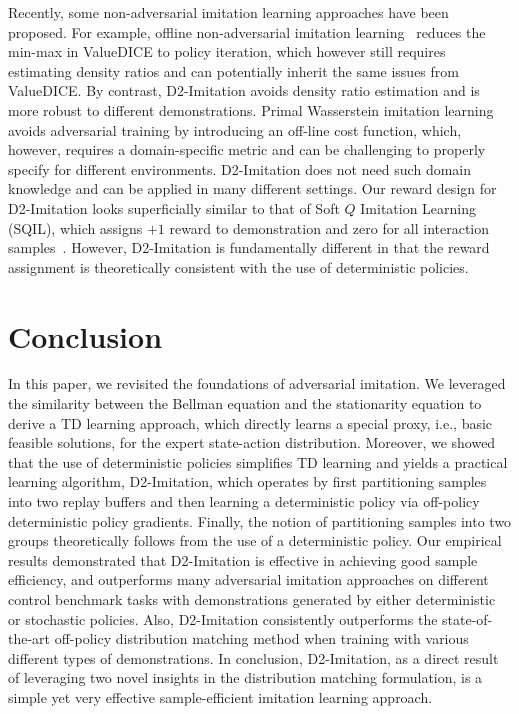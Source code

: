 \documentclass[letterpaper]{article} %
\begin{document}
Recently, some non-adversarial imitation learning approaches have been proposed.
For example, offline non-adversarial imitation learning~\cite{arenz2020non} reduces the min-max in ValueDICE to policy iteration,
which however still requires estimating density ratios and can potentially inherit the same issues from ValueDICE.
By contrast, D2-Imitation avoids density ratio estimation and is more robust to different demonstrations.
Primal Wasserstein imitation learning~\cite{dadashi2020primal} avoids adversarial training by introducing an off-line cost function,
which, however, requires a domain-specific metric and can be challenging to properly specify for different environments.
D2-Imitation does not need such domain knowledge and can be applied in many different settings.
Our reward design for D2-Imitation looks superficially similar to that of Soft $Q$ Imitation Learning (SQIL),
which assigns $+1$ reward to demonstration and zero for all interaction samples~\cite{reddy2019sqil}.
However, D2-Imitation is fundamentally different in that the reward assignment is theoretically consistent with the use of deterministic policies.


\vspace{-1.79mm}
\section{Conclusion}
In this paper, we revisited the foundations of adversarial imitation.
We leveraged the similarity between the Bellman equation and the stationarity equation to derive a TD learning approach, which directly learns a special proxy, i.e., basic feasible solutions, for the expert state-action distribution.
Moreover, we showed that the use of deterministic policies simplifies TD learning and yields a practical learning algorithm,
D2-Imitation, which operates by first partitioning samples into two replay buffers and then learning a deterministic policy via off-policy deterministic policy gradients.
Finally, the notion of partitioning samples into two groups theoretically follows from the use of a deterministic policy.
Our empirical results demonstrated that D2-Imitation is effective in achieving good sample efficiency, and outperforms many adversarial imitation approaches on different control benchmark tasks with demonstrations generated by either deterministic or stochastic policies.
Also, D2-Imitation consistently outperforms the state-of-the-art off-policy distribution matching method when training with various different types of demonstrations.
In conclusion, D2-Imitation, as a direct result of leveraging two novel insights in the distribution matching formulation, is a simple yet very effective sample-efficient imitation learning approach.
\end{document}
